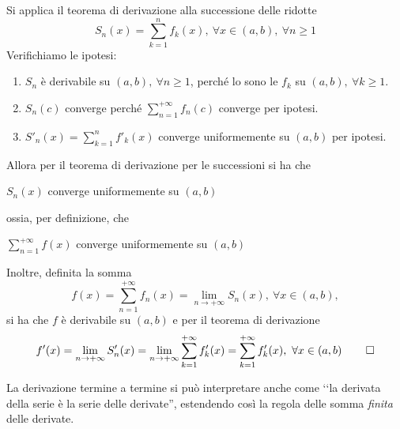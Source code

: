 \begin{demonstration}
	Si applica il teorema di derivazione alla successione delle ridotte
	\begin{equation*}
		S_n(x)=\sum_{k=1}^{n}f_k(x),\ \forall x\in\left(a,b\right),\ \forall n\geq 1
	\end{equation*}
Verifichiamo le ipotesi:
\begin{enumerate}
	\item $S_n$ è derivabile su $\left(a,b\right),\ \forall n\geq 1$, perché lo sono le $f_k$ su $\left(a,b\right),\ \forall k\geq 1$.
	\item $S_n\left(c\right)$ converge perché $\displaystyle\sum_{n=1}^{+\infty}f_n\left(c\right)$ converge per ipotesi.
	\item $S'_n(x)=\displaystyle\sum_{k=1}^{n}f'_k(x)$ converge uniformemente su $\left(a,b\right)$ per ipotesi.
\end{enumerate}
Allora per il teorema di derivazione per le successioni si ha che
\begin{center}
	$S_n(x)$ converge uniformemente su $\left(a,b\right)$
\end{center}
ossia, per definizione, che
\begin{center}
	$\displaystyle\sum_{n=1}^{+\infty}f(x)$ converge uniformemente su $\left(a,b\right)$
\end{center}
Inoltre, definita la somma
\begin{equation*}
	f(x)=\sum_{n=1}^{+\infty}f_n(x)=\lim_{n\to+\infty}S_n(x),\ \forall x\in\left(a,b\right),
\end{equation*}
si ha che $f$ è derivabile su $\left(a,b\right)$ e per il teorema di derivazione
\begin{equation*}
	f'(x)=\lim_{n\to+\infty}S'_n(x)=\lim_{n\to+\infty}\sum_{k=1}^{+\infty}f'_k(x)=\sum_{k=1}^{+\infty}f'_k(x),\ \forall x\in\left(a,b\right)\qedhere
\end{equation*}
\end{demonstration}
\begin{observe}
	La derivazione termine a termine si può interpretare anche come ‘‘la derivata della serie è la serie delle derivate'', estendendo così la regola delle somma \textit{finita} delle derivate.
\end{observe}
